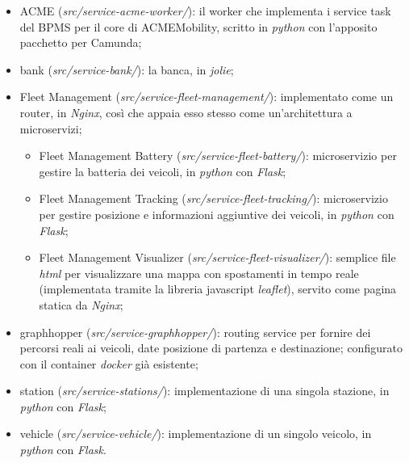 \begin{itemize}
	\item ACME (\textit{src/service-acme-worker/}): il worker che implementa i
	service task del BPMS per il core di ACMEMobility, scritto in
	\textit{python} con l'apposito pacchetto per Camunda;
	\item bank (\textit{src/service-bank/}): la banca, in \textit{jolie};
	\item Fleet Management (\textit{src/service-fleet-management/}):
	implementato come un router, in \textit{Nginx}, così che appaia esso stesso
	come un'architettura a microservizi;
	\begin{itemize}
		\item Fleet Management Battery (\textit{src/service-fleet-battery/}):
		microservizio per gestire la batteria dei veicoli, in \textit{python}
		con \textit{Flask};
		\item Fleet Management Tracking (\textit{src/service-fleet-tracking/}):
		microservizio per gestire posizione e informazioni aggiuntive dei
		veicoli, in \textit{python} con \textit{Flask};
		\item Fleet Management Visualizer
		(\textit{src/service-fleet-visualizer/}): semplice file \textit{html}
		per visualizzare una mappa con spostamenti in tempo reale (implementata
		tramite la libreria javascript \textit{leaflet}), servito come
		pagina statica da \textit{Nginx};
	\end{itemize}
	\item graphhopper (\textit{src/service-graphhopper/}): routing service per
	fornire dei percorsi reali ai veicoli, date posizione di partenza e
	destinazione; configurato con il container \textit{docker} già esistente;
	\item station (\textit{src/service-stations/}): implementazione di una
	singola stazione, in \textit{python} con \textit{Flask};
	\item vehicle (\textit{src/service-vehicle/}): implementazione di un singolo
	veicolo, in \textit{python} con \textit{Flask}.
\end{itemize}

